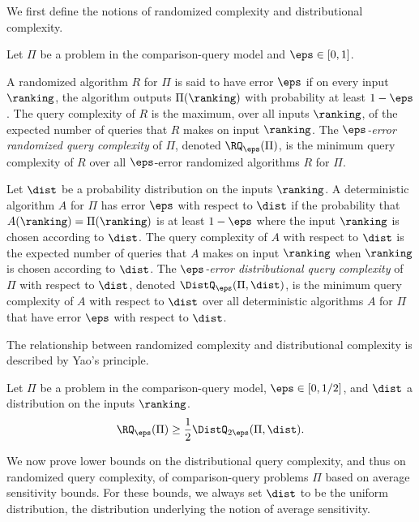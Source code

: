 We first define the notions of randomized complexity and distributional complexity.

\begin{definition}
Let $\Pi$ be a problem in the comparison-query model and $\eps \in [0,1]$.

A randomized algorithm $R$ for $\Pi$ is said to have error $\eps$ if on every input $\ranking$, the algorithm outputs $\Pi(\ranking)$ with probability at least $1-\eps$. The query complexity of $R$ is the maximum, over all inputs $\ranking$, of the expected number of queries that $R$ makes on input $\ranking$. The \emph{$\eps$-error randomized query complexity} of $\Pi$, denoted $\RQ_{\eps}(\Pi)$, is the minimum query complexity of $R$ over all $\eps$-error randomized algorithms $R$ for $\Pi$.

Let $\dist$ be a probability distribution on the inputs $\ranking$. A deterministic algorithm $A$ for $\Pi$ has error $\eps$ with respect to $\dist$ if the probability that $A(\ranking)=\Pi(\ranking)$ is at least $1-\eps$ where the input $\ranking$ is chosen according to $\dist$. The query complexity of $A$ with respect to $\dist$ is the expected number of queries that $A$ makes on input $\ranking$ when $\ranking$ is chosen according to $\dist$. The \emph{$\eps$-error distributional query complexity} of $\Pi$ with respect to $\dist$, denoted $\DistQ_{\eps}(\Pi,\dist)$, is the minimum query complexity of $A$ with respect to $\dist$ over all deterministic algorithms $A$ for $\Pi$ that have error $\eps$ with respect to $\dist$.
\end{definition}

The relationship between randomized complexity and distributional complexity is described by Yao's principle. 

\begin{lemma}
	\label{lemma:yaos-principle}
	Let $\Pi$ be a problem in the comparison-query model, $\eps \in [0,1/2]$, and $\dist$ a distribution on the inputs $\ranking$.
	\begin{equation}\label{eq:yao}
	\RQ_{\eps}(\Pi) \ge \frac{1}{2}\DistQ_{2\eps}(\Pi, \dist). 
	\end{equation}
\end{lemma}

We now prove lower bounds on the distributional query complexity, and thus on randomized query complexity, of comparison-query problems $\Pi$ based on average sensitivity bounds. For these bounds, we always set $\dist$ to be the uniform distribution, the distribution underlying the notion of average sensitivity. 

